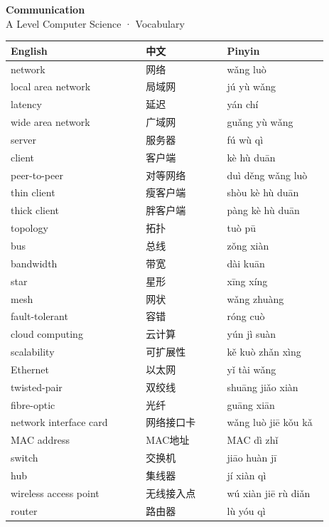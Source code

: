 \documentclass[11pt]{article}
\begin{document}
\begin{center}
  {\LARGE\bfseries Communication}\\[0.35em]
  {\large A Level Computer Science · Vocabulary}
\end{center}
\vspace{0.6em}

\begin{longtable}{@{}p{0.40\linewidth}p{0.24\linewidth}p{0.30\linewidth}@{}}
\toprule
\textbf{English} & \textbf{中文} & \textbf{Pinyin} \\
\midrule
\endhead
\bottomrule
\endlastfoot
network & 网络 & wǎng luò \\
local area network & 局域网 & jú yù wǎng \\
latency & 延迟 & yán chí \\
wide area network & 广域网 & guǎng yù wǎng \\
server & 服务器 & fú wù qì \\
client & 客户端 & kè hù duān \\
peer-to-peer & 对等网络 & duì děng wǎng luò \\
thin client & 瘦客户端 & shòu kè hù duān \\
thick client & 胖客户端 & pàng kè hù duān \\
topology & 拓扑 & tuò pū \\
bus & 总线 & zǒng xiàn \\
bandwidth & 带宽 & dài kuān \\
star & 星形 & xīng xíng \\
mesh & 网状 & wǎng zhuàng \\
fault-tolerant & 容错 & róng cuò \\
cloud computing & 云计算 & yún jì suàn \\
scalability & 可扩展性 & kě kuò zhǎn xìng \\
Ethernet & 以太网 & yǐ tài wǎng \\
twisted-pair & 双绞线 & shuāng jiǎo xiàn \\
fibre-optic & 光纤 & guāng xiān \\
network interface card & 网络接口卡 & wǎng luò jiē kǒu kǎ \\
MAC address & MAC地址 & MAC dì zhǐ \\
switch & 交换机 & jiāo huàn jī \\
hub & 集线器 & jí xiàn qì \\
wireless access point & 无线接入点 & wú xiàn jiē rù diǎn \\
router & 路由器 & lù yóu qì \\

\end{longtable}
\end{document}
